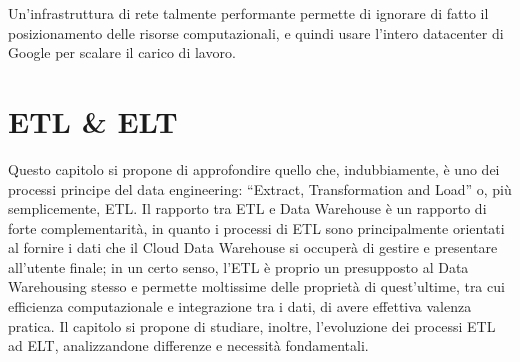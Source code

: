 \documentclass[a4paper,12pt]{report}
\begin{document}
Un’infrastruttura di rete talmente performante permette di ignorare di fatto il posizionamento delle risorse computazionali, e quindi usare l’intero datacenter di Google per scalare il carico di lavoro.

\chapter{ETL \& ELT}
\thispagestyle{empty} %
\fancyhead{} %
\fancyhead[R]{\thepage} %
Questo capitolo si propone di approfondire quello che, indubbiamente, è uno dei processi principe del data engineering: “Extract, Transformation and Load” o, più semplicemente, ETL.
\noindent
 Il rapporto tra ETL e Data Warehouse è un rapporto di forte complementarità, in quanto i processi di ETL sono principalmente orientati al fornire i dati che il Cloud Data Warehouse si occuperà di gestire e presentare all’utente finale; in un certo senso, l’ETL è proprio un presupposto al Data Warehousing stesso e permette moltissime delle proprietà di quest’ultime, tra cui efficienza computazionale e integrazione tra i dati, di avere effettiva valenza pratica. Il capitolo si propone di studiare, inoltre, l’evoluzione dei processi ETL ad ELT, analizzandone differenze e necessità fondamentali.
\end{document}

